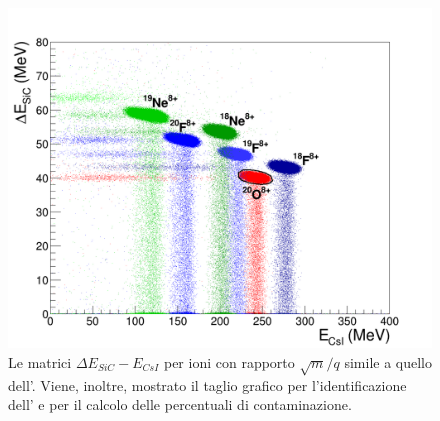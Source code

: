 \begin{figure} [!p]
	\centering
	\includegraphics[width=\textwidth, keepaspectratio]{Grafici_Tesi2/PID/deltaE_Ecsi_stati_carica_taglio_label.png}
	\caption{Le matrici $\Delta E_{SiC} - E_{CsI}$ per ioni con rapporto $\sqrt{m}/q$ simile a quello dell'. Viene, inoltre, mostrato il taglio grafico per l'identificazione dell' e per il calcolo delle percentuali di contaminazione.} \label{fig:deltaE_Ecsi_stati_carica}
\end{figure}




